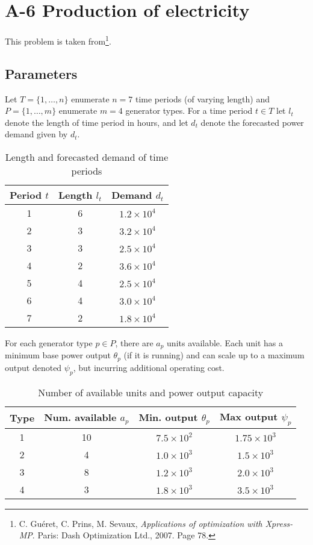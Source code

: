 \documentclass[8pt,oneside]{extarticle}
\begin{document}
\section{A-6 Production of electricity}

This problem is taken from\footnote{C. Guéret, C. Prins, M. Sevaux, \textit{Applications of optimization with Xpress-MP}. %
Paris: Dash Optimization Ltd., 2007. Page 78.}.

\subsection{Parameters}

Let $T=\lbrace 1,\ldots, n\rbrace$ enumerate $n=7$ time periods (of varying length) and $P=\lbrace 1,\ldots, m\rbrace$ enumerate
$m=4$ generator types. For a time period $t\in T$ let $l_t$
denote the length of time period in hours, and
let $d_t$ denote the forecasted power demand given by $d_t$.

\begin{table}[h]
    \center
    \caption{Length and forecasted demand of time periods}\label{table:a6-periods}
    \begin{tabular}{c c c}
        \hline
        \textbf{Period} $t$ & \textbf{Length} $l_t$ & \textbf{Demand} $d_t$ \\
        \hline
        1 & 6 & $1.2 \times 10^4$ \\
        2 & 3 & $3.2 \times 10^4$ \\
        3 & 3 & $2.5 \times 10^4$ \\
        4 & 2 & $3.6 \times 10^4$ \\
        5 & 4 & $2.5 \times 10^4$ \\
        6 & 4 & $3.0 \times 10^4$ \\
        7 & 2 & $1.8 \times 10^4$ \\
        \hline
    \end{tabular}
\end{table}

For each generator type $p\in P$, there are $a_p$ units available. Each unit has
a minimum base power output $\theta_p$ (if it is running) and can scale up to a
maximum output denoted $\psi_p$, but incurring additional operating cost.

\begin{table}[h]
    \center
    \caption{Number of available units and power output capacity}\label{table:a6-generators}
    \begin{tabular}{cccc}
        \hline
        \textbf{Type} & \textbf{Num. available} $a_p$ & \textbf{Min. output} $\theta_p$ & \textbf{Max output} $\psi_p$ \\
        \hline
        1 & 10 & $7.5\times 10^2$ & $1.75\times 10^3$ \\
        2 & 4 & $1.0\times 10^3$ & $1.5\times 10^3$ \\
        3 & 8 & $1.2\times 10^3$ & $2.0\times 10^3$ \\
        4 & 3 & $1.8\times 10^3$ & $3.5\times 10^3$ \\
        \hline
    \end{tabular}
\end{table}
\end{document}
